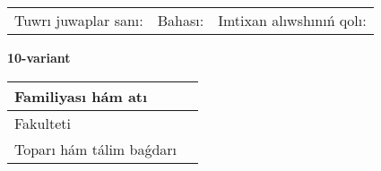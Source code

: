 \documentclass{article}
\begin{document}
\vspace{1cm}

\begin{tabular}{lll}
Tuwrı juwaplar sanı: \underline{\hspace{1.5cm}} & 
Bahası: \underline{\hspace{1.5cm}} & 
Imtixan alıwshınıń qolı: \underline{\hspace{2cm}} \\
\end{tabular}

\egroup

\newpage


\textbf{10-variant}\\

\bgroup
\def\arraystretch{1.6} %

\begin{tabular}{|m{5.7cm}|m{9.5cm}|}
\hline
Familiyası hám atı & \\
\hline
Fakulteti  & \\
\hline
Toparı hám tálim baǵdarı  & \\
\hline
\end{tabular}

\vspace{1cm}
\end{document}
